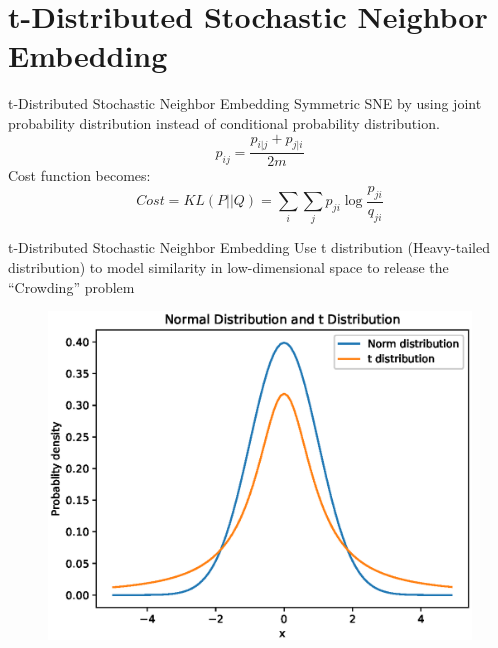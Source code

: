 \documentclass[10pt]{beamer}
\begin{document}
\section{t-Distributed Stochastic Neighbor Embedding}
\begin{frame}{t-Distributed Stochastic Neighbor Embedding}
Symmetric SNE by using joint probability distribution instead of conditional probability distribution.
\begin{displaymath}
	p_{ij} = \frac{p_{i|j} + p_{j|i}}{2m}
\end{displaymath}
Cost function becomes:
\begin{displaymath}
	Cost =  KL(P||Q) = \sum_i\sum_j p_{ji} \log\frac{p_{ji}}{q_{ji}}
\end{displaymath}
\end{frame}


\begin{frame}{t-Distributed Stochastic Neighbor Embedding}
Use t distribution (Heavy-tailed distribution) to model similarity in low-dimensional space to release the ``Crowding'' problem
\begin{figure}
\centering
\includegraphics[scale=0.5]{./image/tsne2.eps}
\end{figure}
\end{frame}
\end{document}
